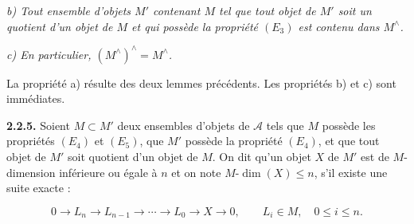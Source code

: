 \noindent\textit{b) Tout ensemble d'objets $M'$ contenant $M$ tel que tout
objet de $M'$ soit un quotient d'un objet de $M$ et qui possède la
propriété $(E_3)$ est contenu dans $M^{\wedge}$.}

\noindent\textit{c) En particulier,
$(M^{\wedge})^{\wedge}=M^{\wedge}$.}

La propriété a) résulte des deux lemmes précédents. Les propriétés b) et
c) sont immédiates.

\medskip\noindent\textbf{2.2.5.}\quad
Soient $M\subset M'$ deux ensembles d'objets de $\mathcal A$ tels que $M$
possède les propriétés $(E_4)$ et $(E_5)$, que $M'$ possède la propriété
$(E_4)$, et que tout objet de $M'$ soit quotient d'un objet de $M$. On dit
qu'un objet $X$ de $M'$ est de $M$-dimension inférieure ou égale à $n$ et
on note $M\text{-}\dim(X)\leq n$, s'il existe une suite exacte :

\[
0\longrightarrow L_n\longrightarrow L_{n-1}\longrightarrow\cdots
\longrightarrow L_0\longrightarrow X\longrightarrow0,
\qquad L_i\in M,\quad0\leq i\leq n.
\]
\endgroup
